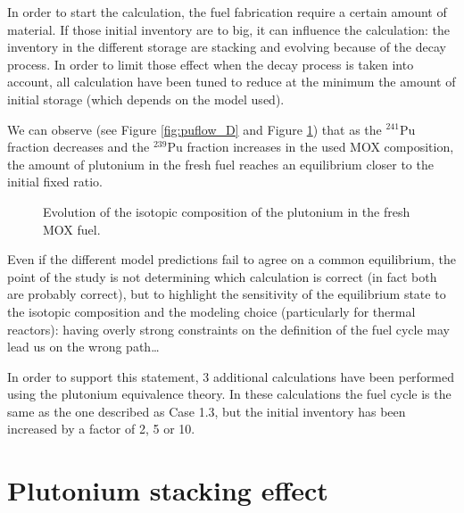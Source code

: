 \documentclass[12pt]{article}
\begin{document}
In order to start the calculation, the fuel fabrication require a certain amount
of material. If those initial inventory are to big, it can influence the
calculation: the inventory in the different storage are stacking and evolving
because of the decay process. In order to limit those effect when the decay
process is taken into account, all calculation have been tuned to reduce at the
minimum the amount of initial storage (which depends on the model used).

We can observe (see Figure \ref{fig:puflow_D} and Figure \ref{fig:pu_compo})
that as the $^{241}$Pu fraction decreases and the $^{239}$Pu fraction increases in
the used MOX composition, the amount of plutonium in the fresh fuel reaches an
equilibrium closer to the initial fixed ratio.

\begin{figure}[h!]
  \centering
  

  \caption{ Evolution of the isotopic composition of the plutonium in the fresh MOX fuel.
    \label{fig:pu_compo} } 
  \end{figure}

Even if the different model predictions fail to agree on a common equilibrium,
the point of the study is not determining which calculation is correct (in fact
both are probably correct), but to highlight the sensitivity of the equilibrium
state to the isotopic composition and the modeling choice (particularly for
thermal reactors): having overly strong constraints on the definition of the
fuel cycle may lead us on the wrong path\dots


In order to support this statement, 3 additional calculations have been performed
using the plutonium equivalence theory. In these calculations the fuel cycle is
the same as the one described as Case 1.3, but the initial inventory has been
increased by a factor of 2, 5 or 10.


\section{Plutonium stacking effect}
\end{document}
